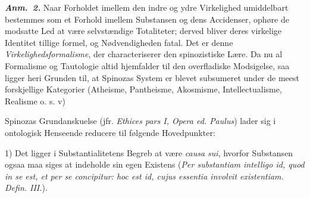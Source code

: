 \documentclass[12pt]{book}
\newcommand{\anm}[1]{\emph{\textbf{Anm.~#1.}}}
\begin{document}
\anm{2} Naar Forholdet imellem den indre og ydre Virkelighed umiddelbart bestemmes som
et Forhold imellem Substansen og dens Accidenser, ophøre de modsatte Led at være
selvstændige Totaliteter; derved bliver deres virkelige Identitet tillige formel, og
Nødvendigheden fatal. Det er denne \emph{Virkelighedsformalisme}, der characteriserer
den spinozistiske Lære. Da nu al Formalisme og Tautologie altid hjemfalder til den
overfladiske Modsigelse, saa ligger heri Grunden til, at Spinozas System er blevet
subsumeret under de meest forskjellige Kategorier (Atheisme, Pantheisme, Akosmisme,
Intellectualisme, Realisme o. s. v)

Spinozas Grundanskuelse (jfr. \textit{Ethices pars I, Opera ed. Paulus}) lader sig i
ontologisk Henseende reducere til følgende Hovedpunkter:

1) Det ligger i Substantialitetens Begreb at være \textit{causa sui}, hvorfor
Substansen ogsaa maa siges at indeholde sin egen Existens (\textit{Per substantiam
intelligo id, quod in se est, et per se concipitur: hoc est id, cujus essentia involvit
existentiam. Defin. III.}).
\end{document}
